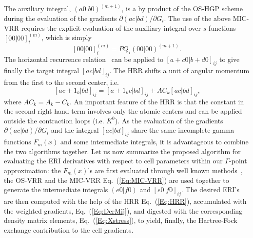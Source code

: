 \documentclass[prl,twocolumn,showpacs,twocolumngrid,superbib]{revtex4}
\begin{document}
The auxiliary integral, $(a0|b0)^{(m+1)}$, is a by product of the OS-HGP scheme during
the evaluation of the gradients $\partial (ac|bd)/\partial G_i$.
The use of the above MIC-VRR requires the explicit evaluation of the auxiliary integral
over $s$ functions $[00|00]_{i}^{(m)}$, which is simply
\begin{equation*}
    [00|00]_{i}^{(m)}
    =PQ_i(00|00)^{(m+1)}.
\end{equation*}
The horizontal recurrence relation~\cite{MGordon88} can be applied to $[a+c0|b+d0]_{ij}$ to give 
finally the target integral $[ac|bd]_{ij}$.
The HRR shifts a unit of angular momentum from the first to the second center, i.e.
\begin{equation}~\label{Eq:HRR}
  [ac+1_k|bd]_{ij}=[a+1_kc|bd]_{ij}+AC_k[ac|bd]_{ij},
\end{equation}
where $AC_k=A_k-C_k$. An important feature of the HRR is that the 
constant in the second right hand term involves only the atomic centers
and can be applied outside the contraction loops (i.e. $K^0$).
As the evaluation of the gradients $\partial (ac|bd)/\partial G_i$ and the integral
$[ac|bd]_{ij}$ share the same incomplete gamma functions 
$F_m(x)$ and some intermediate integrals, it is 
advantageous to combine the two algorithms together.
Let us now summarize the proposed algorithm for evaluating the ERI derivatives
with respect to cell parameters within our $\Gamma$-point approximation:
the $F_m(x)$'s are first evaluated through well known methods~\cite{LMcmurchie78,SObara86},
the OS-VRR and the MIC-VRR Eq.~(\ref{Eq:MIC-VRR}) are used together 
to generate the intermediate integrals $(e0|f0)$ and $[e0|f0]_{ij}$. The
desired ERI's are then computed with the help of the HRR Eq.~(\ref{Eq:HRR}),
accumulated with the weighted gradients, Eq.~(\ref{Eq:DerMij}), and digested
with the corresponding density matrix elements, Eq.~(\ref{Eq:Xstress}), to
yield, finally, the Hartree-Fock exchange contribution to the cell gradients.
\end{document}
